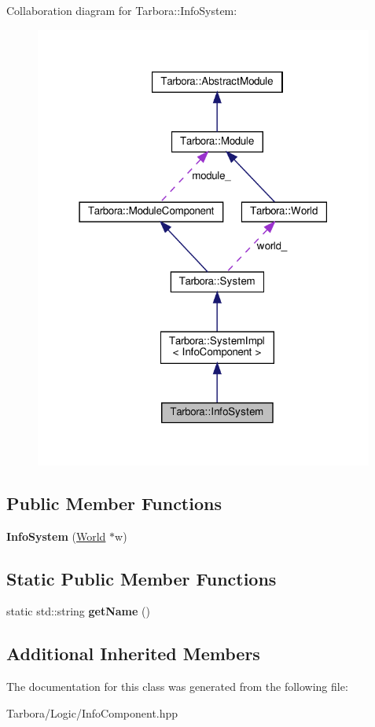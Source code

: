 Collaboration diagram for Tarbora\+:\+:Info\+System\+:
\nopagebreak
\begin{figure}[H]
\begin{center}
\leavevmode
\includegraphics[width=316pt]{classTarbora_1_1InfoSystem__coll__graph}
\end{center}
\end{figure}
\subsection*{Public Member Functions}
\begin{DoxyCompactItemize}
\item 
\mbox{\label{classTarbora_1_1InfoSystem_aa51ed7d2c8080dcaec3ab3f885bb20da}} 
{\bfseries Info\+System} (\hyperlink{classTarbora_1_1World}{World} $\ast$w)
\end{DoxyCompactItemize}
\subsection*{Static Public Member Functions}
\begin{DoxyCompactItemize}
\item 
\mbox{\label{classTarbora_1_1InfoSystem_a12d888ad9d36d89e2d54b25540a6dbae}} 
static std\+::string {\bfseries get\+Name} ()
\end{DoxyCompactItemize}
\subsection*{Additional Inherited Members}


The documentation for this class was generated from the following file\+:\begin{DoxyCompactItemize}
\item 
Tarbora/\+Logic/Info\+Component.\+hpp\end{DoxyCompactItemize}
